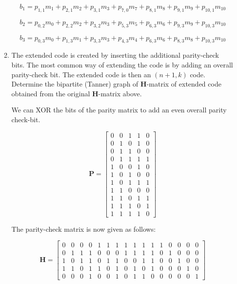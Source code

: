 \documentclass[fleqn]{article}
\begin{document}
\begin{enumerate}
\begin{enumerate}
			\begin{equation*}
				b_1 = p_{1,1}m_{1} + p_{2,1}m_{2} + p_{3,1}m_{3} + p_{7,0}m_{7} + p_{8,1}m_{8} + p_{9,1}m_{9} + p_{10,1}m_{10}
			\end{equation*}
			
			\begin{equation*}
				b_2 = p_{0,2}m_{0} + p_{2,2}m_{2} + p_{3,2}m_{3} + p_{5,3}m_{5} + p_{6,3}m_{6} + p_{9,3}m_{9} + p_{10,3}m_{10}
			\end{equation*}
			
			\begin{equation*}
				b_3 = p_{0,3}m_{0} + p_{1,3}m_{1} + p_{3,3}m_{3} + p_{4,3}m_{4} + p_{6,3}m_{6} + p_{8,3}m_{8} + p_{10,3}m_{10}
			\end{equation*}
			
			\item The extended code is created by inserting the additional parity-check bits. The most common way of extending the code is by adding an overall parity-check bit. The extended code is then an $(n+1,k)$ code. Determine the bipartite (Tanner) graph of $\mathbf{H}$-matrix of extended code obtained from the original $\mathbf{H}$-matrix above.
			
			We can XOR the bits of the parity matrix to add an even overall parity check-bit.
			
			\begin{equation*}
				\mathbf{P} = \begin{bmatrix}
					0 & 0 & 1 & 1 & 0 \\
					0 & 1 & 0 & 1 & 0 \\
					0 & 1 & 1 & 0 & 0 \\
					0 & 1 & 1 & 1 & 1 \\
					1 & 0 & 0 & 1 & 0 \\
					1 & 0 & 1 & 0 & 0 \\
					1 & 0 & 1 & 1 & 1 \\
					1 & 1 & 0 & 0 & 0 \\
					1 & 1 & 0 & 1 & 1 \\
					1 & 1 & 1 & 0 & 1 \\
					1 & 1 & 1 & 1 & 0
				\end{bmatrix}
			\end{equation*}
			
			The parity-check matrix is now given as follows:
			
			\begin{equation*}
				\mathbf{H} = \begin{bmatrix}
					0 & 0 & 0 & 0 & 1 & 1 & 1 & 1 & 1 & 1 & 1 & 1 & 0 & 0 & 0 & 0\\
					0 & 1 & 1 & 1 & 0 & 0 & 0 & 1 & 1 & 1 & 1 & 0 & 1 & 0 & 0 & 0\\
					1 & 0 & 1 & 1 & 0 & 1 & 1 & 0 & 0 & 1 & 1 & 0 & 0 & 1 & 0 & 0\\
					1 & 1 & 0 & 1 & 1 & 0 & 1 & 0 & 1 & 0 & 1 & 0 & 0 & 0 & 1 & 0\\
					0 & 0 & 0 & 1 & 0 & 0 & 1 & 0 & 1 & 1 & 0 & 0 & 0 & 0 & 0 & 1
				\end{bmatrix}
			\end{equation*}
				

\end{enumerate}
\end{enumerate}
\end{document}
